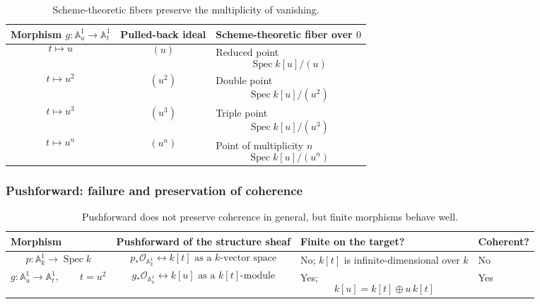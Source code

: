 \documentclass[12pt,a4paper]{article}
\DeclareMathOperator{\Spec}{Spec}
\newcommand{\OO}{\mathcal{O}}
\providecommand{\Spec}{\operatorname{Spec}}
\providecommand{\A}{\mathbb A}
\theoremstyle{notespace}
\begin{document}
\begin{table}[htbp]
	\centering
	\renewcommand{\arraystretch}{1.45}
	\begin{tabular}{|p{4.7cm}|p{3.7cm}|p{4.6cm}|}
		\hline
		\textbf{Morph\-ism \(g:\A^1_u\to\A^1_t\)}
		&
		\textbf{Pulled-back ideal}
		&
		\textbf{Scheme-theoretic fiber over \(0\)}
		\\
		\hline
		\[
		t\longmapsto u
		\]
		&
		\[
		(u)
		\]
		&
		Reduced point
		\[
		\Spec k[u]/(u)
		\]
		\\
		\hline
		\[
		t\longmapsto u^2
		\]
		&
		\[
		(u^2)
		\]
		&
		Double point
		\[
		\Spec k[u]/(u^2)
		\]
		\\
		\hline
		\[
		t\longmapsto u^3
		\]
		&
		\[
		(u^3)
		\]
		&
		Triple point
		\[
		\Spec k[u]/(u^3)
		\]
		\\
		\hline
		\[
		t\longmapsto u^n
		\]
		&
		\[
		(u^n)
		\]
		&
		Point of multiplicity \(n\)
		\[
		\Spec k[u]/(u^n)
		\]
		\\
		\hline
	\end{tabular}
	\caption{Scheme-theoretic fibers preserve the multiplicity of vanishing.}
\end{table}

\subsubsection{Pushforward: failure and preservation of coherence}

\begin{table}[htbp]
	\centering
	\renewcommand{\arraystretch}{1.45}
	\begin{adjustbox}{max width=\textwidth}
		\begin{tabular}{|p{5.8cm}|p{5.7cm}|p{4.0cm}|p{2.4cm}|}
			\hline
			\textbf{Morph\-ism}
			&
			\textbf{Pushforward of the structure sheaf}
			&
			\textbf{Finite on the target?}
			&
			\textbf{Coherent?}
			\\
			\hline
			\[
			p:\A^1_k\longrightarrow\Spec k
			\]
			&
			\[
			p_*\OO_{\A^1_k}
			\leftrightarrow
			k[t]\text{ as a }k\text{-vector space}
			\]
			&
			No; \(k[t]\) is infinite-dimensional over \(k\)
			&
			No
			\\
			\hline
			\[
			g:\A^1_u\longrightarrow\A^1_t,
			\qquad
			t=u^2
			\]
			&
			\[
			g_*\OO_{\A^1_u}
			\leftrightarrow
			k[u]\text{ as a }k[t]\text{-module}
			\]
			&
			Yes;
			\[
			k[u]=k[t]\oplus u\,k[t]
			\]
			&
			Yes
			\\
			\hline
		\end{tabular}
	\end{adjustbox}
	\caption{Pushforward does not preserve coherence in general, but finite morphisms behave well.}
\end{table}
\end{document}
